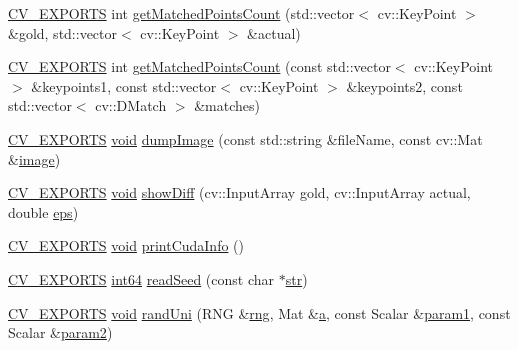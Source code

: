 \begin{DoxyCompactItemize}
\item 
\hyperlink{core_2types__c_8h_a1bf9f0e121b54272da02379cfccd0a2b}{C\-V\-\_\-\-E\-X\-P\-O\-R\-T\-S} int \hyperlink{namespacecvtest_a2ae43940bcb727e8843d8b290bdfe3ff}{get\-Matched\-Points\-Count} (std\-::vector$<$ cv\-::\-Key\-Point $>$ \&gold, std\-::vector$<$ cv\-::\-Key\-Point $>$ \&actual)
\item 
\hyperlink{core_2types__c_8h_a1bf9f0e121b54272da02379cfccd0a2b}{C\-V\-\_\-\-E\-X\-P\-O\-R\-T\-S} int \hyperlink{namespacecvtest_a24ebdb69863aa30101d780ac1eb2d8c5}{get\-Matched\-Points\-Count} (const std\-::vector$<$ cv\-::\-Key\-Point $>$ \&keypoints1, const std\-::vector$<$ cv\-::\-Key\-Point $>$ \&keypoints2, const std\-::vector$<$ cv\-::\-D\-Match $>$ \&matches)
\item 
\hyperlink{core_2types__c_8h_a1bf9f0e121b54272da02379cfccd0a2b}{C\-V\-\_\-\-E\-X\-P\-O\-R\-T\-S} \hyperlink{legacy_8hpp_a8bb47f092d473522721002c86c13b94e}{void} \hyperlink{namespacecvtest_a82f5ad3928bdb1f0b38465f61b9fdd77}{dump\-Image} (const std\-::string \&file\-Name, const cv\-::\-Mat \&\hyperlink{legacy_8hpp_ad62b16ab219ae2483e8a3d921c44cc97}{image})
\item 
\hyperlink{core_2types__c_8h_a1bf9f0e121b54272da02379cfccd0a2b}{C\-V\-\_\-\-E\-X\-P\-O\-R\-T\-S} \hyperlink{legacy_8hpp_a8bb47f092d473522721002c86c13b94e}{void} \hyperlink{namespacecvtest_a42a57baaa6ef670d1c8032d7de406d58}{show\-Diff} (cv\-::\-Input\-Array gold, cv\-::\-Input\-Array actual, double \hyperlink{imgproc__c_8h_aabece9d4af1ab09d2f85ade473757e32}{eps})
\item 
\hyperlink{core_2types__c_8h_a1bf9f0e121b54272da02379cfccd0a2b}{C\-V\-\_\-\-E\-X\-P\-O\-R\-T\-S} \hyperlink{legacy_8hpp_a8bb47f092d473522721002c86c13b94e}{void} \hyperlink{namespacecvtest_a843732e6969ab0b29e9ebeee65f2cc4a}{print\-Cuda\-Info} ()
\item 
\hyperlink{core_2types__c_8h_a1bf9f0e121b54272da02379cfccd0a2b}{C\-V\-\_\-\-E\-X\-P\-O\-R\-T\-S} \hyperlink{core_2types__c_8h_a7cde0074dfd288f2d70c0e035dacb28a}{int64} \hyperlink{namespacecvtest_ab0222728fa931142fef72ae0074fa864}{read\-Seed} (const char $\ast$\hyperlink{core__c_8h_a5f3a65d240411b0018990ff992b348c0}{str})
\item 
\hyperlink{core_2types__c_8h_a1bf9f0e121b54272da02379cfccd0a2b}{C\-V\-\_\-\-E\-X\-P\-O\-R\-T\-S} \hyperlink{legacy_8hpp_a8bb47f092d473522721002c86c13b94e}{void} \hyperlink{namespacecvtest_a0808ba0b7eb71c9714343795cc8f4a73}{rand\-Uni} (R\-N\-G \&\hyperlink{core__c_8h_a8d3f239dca9d5c72c8a66d7a1c142efd}{rng}, Mat \&\hyperlink{legacy_8hpp_a1031d0e0a97a340abfe0a6ab9e831045}{a}, const Scalar \&\hyperlink{core__c_8h_a4a138cebb3d1124bb552aa80cc860eea}{param1}, const Scalar \&\hyperlink{core__c_8h_a31355e809c125347b49af078e58da79e}{param2})

\end{DoxyCompactItemize}
